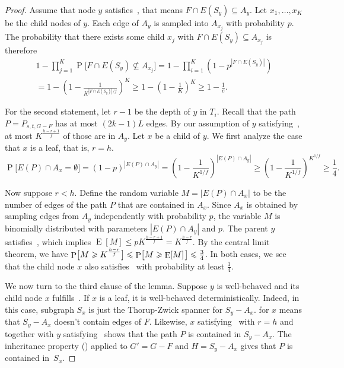 \documentclass{theoretics}
\DeclareMathOperator{\Pb}{P}
\DeclareMathOperator{\Ev}{E}
\newcommand*{\nwspace}{\hspace*{.1em}}
\renewcommand{\geq}{\geqslant}
\renewcommand{\le}{\leqslant}
\begin{document}
\begin{proof}
  Assume that node $y$ satisfies~,
  that means $F\cap E(S_y)\subseteq A_y$.
  Let $x_1,\ldots,x_K$ be the child nodes of $y$.
  Each edge of $A_y$ is sampled into $A_{x_j}$ with probability $p$.
  The probability that there exists some child $x_j$ with
  $F\cap E(S_y) \subseteq A_{x_j}$ is therefore
  \begin{multline*}
    1-\prod_{j=1}^{K}\Pb\!\Big[F\cap E(S_y) \nsubseteq A_{x_j}\Big]
      = 1-\prod_{i=1}^{K} \left(1-p^{|F\cap E(S_y)|} \right)\\
      = 1-\left(1-\frac{1}{K^{|F\cap E(S_y)|/f}} \right)^K
      \geq  1-\left(1-\frac{1}{K}\right)^{K} 
       \geq 1-\frac{1}{e}.
  \end{multline*} 

  For the second statement, let $r{-}1$ be the depth of $y$ in $T_i$.
  Recall that the path $P = P_{s,t,G-F}$ has at most $(2k{-}1)L$ edges.
  By our assumption of $y$ satisfying~, 
  at most $K^{\frac{h-r+1}{f}}$ of those are in $A_y$. 
  Let $x$ be a child of $y$.
  We first analyze the case that $x$ is a leaf, that is, $r=h$.
  \begin{equation*}
    \Pb\!\Big[E(P)\cap A_x=\emptyset \Big] 
      = (1-p)^{|E(P)\cap A_y|}
       = \left( 1- \frac{1}{K^{1/f}} \right)^{|E(P)\cap A_y|}
      \geq \left( 1- \frac{1}{K^{1/f}}\right)^{K^{1/f}}
       \geq \frac{1}{4}.
  \end{equation*}
  
  Now suppose $r < h$.
  Define the random variable $M = |E(P) \cap A_x|$ to be the number of edges of the path $P$
  that are contained in $A_x$.
  Since $A_x$ is obtained by sampling edges from $A_y$ independently with probability $p$,
  the variable $M$ is binomially distributed with parameters $|E(P) \cap A_y|$ and $p$.
  The parent $y$ satisfies~,
  which implies  $\Ev[M] \le p K^{\frac{h-r+1}{f}} = K^{\frac{h-r}{f}}$.
  By the central limit theorem, we have
  $\Pb\!\big[ M \geq K^{\frac{h-r}{f}} \big]
      \le \Pb\!\big[ M \geq \Ev[M] \nwspace \big] \le \frac{3}{4}$.
  In both cases, we see that the child node $x$ also satisfies~ 
  with probability at least $\frac{1}{4}$.
  
  We now turn to the third clause of the lemma. 
  Suppose $y$ is well-behaved and its child node $x$ fulfills~.
  If $x$ is a leaf, it is well-behaved deterministically.
  Indeed, in this case, subgraph $S_x$ is just the Thorup-Zwick spanner for $S_y-A_x$.
   for $x$ means that $S_y-A_x$ doesn't contain edges of $F$.
  Likewise, $x$ satisfying~ with $r = h$ and
  together with $y$ satisfying~
  shows that the path $P$ is contained in $S_y-A_x$.
  The inheritance property () applied to
  $G' = G-F$ and $H = S_y-A_x$ gives that $P$ is contained in~$S_x$.
  

\end{proof}
\end{document}
